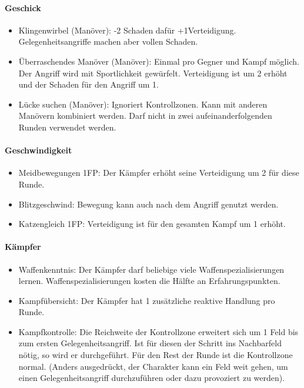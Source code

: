 \documentclass{article}
\begin{document}
\paragraph{Geschick}

\begin{itemize}
\item Klingenwirbel (Manöver): -2 Schaden dafür +1Verteidigung. Gelegenheitsangriffe machen aber vollen Schaden.
\item Überraschendes Manöver (Manöver): Einmal pro Gegner und Kampf möglich. Der Angriff wird mit Sportlichkeit gewürfelt. Verteidigung ist um 2 erhöht und der Schaden für den Angriff um 1.
\item Lücke suchen (Manöver): Ignoriert Kontrollzonen. Kann mit anderen Manövern kombiniert werden. Darf nicht in zwei aufeinanderfolgenden Runden verwendet werden.
\end{itemize}

\paragraph{Geschwindigkeit}

\begin{itemize}
\item Meidbewegungen 1FP: Der Kämpfer erhöht seine Verteidigung um 2 für diese Runde.
\item Blitzgeschwind: Bewegung kann auch nach dem Angriff genutzt werden.
\item Katzengleich 1FP: Verteidigung ist für den gesamten Kampf um 1 erhöht.
\end{itemize}

\paragraph{Kämpfer}

\begin{itemize}
\item Waffenkenntnis: Der Kämpfer darf beliebige viele Waffenspezialisierungen lernen. Waffenspezialisierungen kosten die Hälfte an Erfahrungspunkten.
\item Kampfübersicht: Der Kämpfer hat 1 zusätzliche reaktive Handlung pro Runde.
\item Kampfkontrolle: Die Reichweite der Kontrollzone erweitert sich um 1 Feld bis zum ersten Gelegenheitsangriff. Ist für diesen der Schritt ins Nachbarfeld nötig, so wird er durchgeführt. Für den Rest der Runde ist die Kontrollzone normal. (Anders ausgedrückt, der Charakter kann ein Feld weit gehen, um einen Gelegenheitsangriff durchzuführen oder dazu provoziert zu werden).
\end{itemize}
\end{document}
